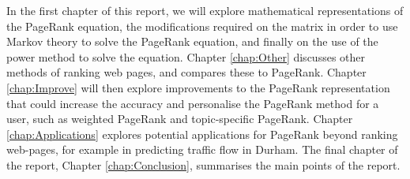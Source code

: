 In the first chapter of this report, we will explore mathematical representations of the PageRank equation, the modifications required on the matrix in order to use Markov theory to solve the PageRank equation, and finally on the use of the power method to solve the equation. Chapter \ref{chap:Other} discusses other methods of ranking web pages, and compares these to PageRank. Chapter \ref{chap:Improve} will then explore improvements to the PageRank representation that could increase the accuracy and personalise the PageRank method for a user, such as weighted PageRank and topic-specific PageRank. Chapter \ref{chap:Applications} explores potential applications for PageRank beyond ranking web-pages, for example in predicting traffic flow in Durham. The final chapter of the report, Chapter \ref{chap:Conclusion}, summarises the main points of the report.
